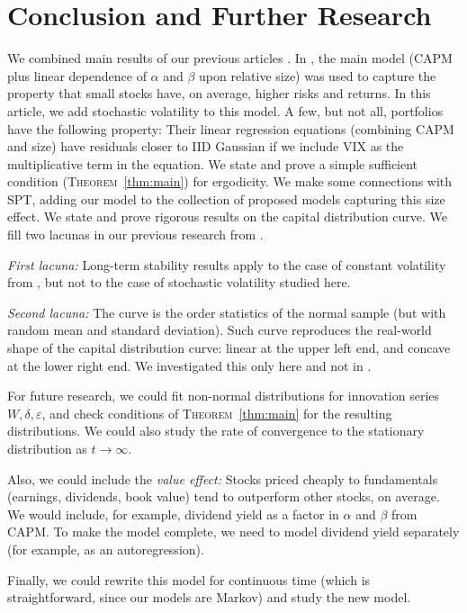 \documentclass[12pt]{amsart}
\begin{document}
\section{Conclusion and Further Research} 

We combined main results of our previous articles \cite{CAPM-size, VIX}. In \cite{CAPM-size}, the main model (CAPM plus linear dependence of $\alpha$ and $\beta$ upon relative size) was used to capture the property that small stocks have, on average, higher risks and returns. In this article, we add stochastic volatility to this model. A few, but not all, portfolios have the following property: Their linear regression equations (combining CAPM and size) have residuals closer to IID Gaussian if we include VIX as the multiplicative term in the equation. We state and prove a simple sufficient condition (\textsc{Theorem}~\ref{thm:main}) for ergodicity. We make some connections with SPT, adding our model to the collection of proposed models capturing this size effect. We state and prove rigorous results on the capital distribution curve. We fill two lacunas in our previous research from \cite{CAPM-size}. 

{\it First lacuna:} Long-term stability results apply to the case of constant volatility from \cite{CAPM-size}, but not to the case of stochastic volatility studied here. 

{\it Second lacuna:} The curve is the order statistics of the normal sample (but with random mean and standard deviation). Such curve reproduces the real-world shape of the capital distribution curve: linear at the upper left end, and concave at the lower right end. We investigated this only here and not in \cite{CAPM-size}.

For future research, we could fit non-normal distributions for innovation series $W, \delta, \varepsilon$, and check conditions of \textsc{Theorem}~\ref{thm:main} for the resulting distributions. We could also study the rate of convergence to the stationary distribution as $t \to \infty$. 

Also, we could include the {\it value effect:} Stocks priced cheaply to fundamentals (earnings, dividends, book value) tend to outperform other stocks, on average. We would include, for example, dividend yield as a factor in $\alpha$ and $\beta$ from CAPM. To make the model complete, we need to model dividend yield separately (for example, as an autoregression). %

Finally, we could rewrite this model for continuous time (which is straightforward, since our models are Markov) and study the new model.
\end{document}
